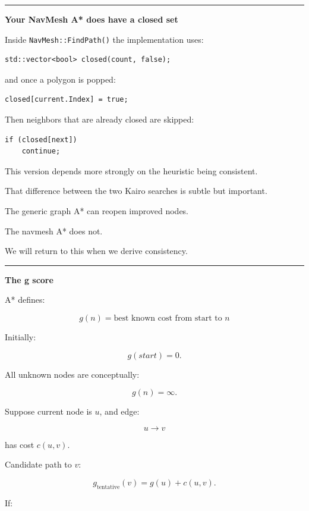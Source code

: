 \begin{center}\rule{0.5\linewidth}{0.5pt}\end{center}

\textbf{Your NavMesh A* does have a closed set}

Inside \texttt{NavMesh::FindPath()} the implementation uses:

\begin{verbatim}
std::vector<bool> closed(count, false);
\end{verbatim}

and once a polygon is popped:

\begin{verbatim}
closed[current.Index] = true;
\end{verbatim}

Then neighbors that are already closed are skipped:

\begin{verbatim}
if (closed[next])
    continue;
\end{verbatim}

This version depends more strongly on the heuristic being consistent.

That difference between the two Kairo searches is subtle but important.

The generic graph A* can reopen improved nodes.

The navmesh A* does not.

We will return to this when we derive consistency.

\begin{center}\rule{0.5\linewidth}{0.5pt}\end{center}

\textbf{The g score}

A* defines:

\[
\boxed{
g(n)
=
\text{best known cost from start to }n
}
\]

Initially:

\[
g(start)=0.
\]

All unknown nodes are conceptually:

\[
g(n)=\infty.
\]

Suppose current node is \(u\), and edge:

\[
u\rightarrow v
\]

has cost \(c(u,v)\).

Candidate path to \(v\):

\[
g_{\text{tentative}}(v)
=
g(u)+c(u,v).
\]

If:

